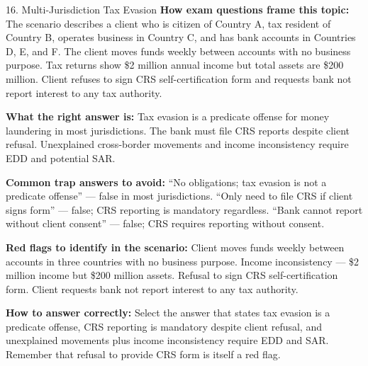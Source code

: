 \documentclass[11pt,a4paper]{beamer}
\begin{document}
	\begin{frame}{16. Multi-Jurisdiction Tax Evasion}
		\tiny
		\noindent\textbf{How exam questions frame this topic:} The scenario describes a client who is citizen of Country A, tax resident of Country B, operates business in Country C, and has bank accounts in Countries D, E, and F. The client moves funds weekly between accounts with no business purpose. Tax returns show \$2 million annual income but total assets are \$200 million. Client refuses to sign CRS self-certification form and requests bank not report interest to any tax authority.
		
		\vspace{0.1cm}
		\noindent\textbf{What the right answer is:} Tax evasion is a predicate offense for money laundering in most jurisdictions. The bank must file CRS reports despite client refusal. Unexplained cross-border movements and income inconsistency require EDD and potential SAR.
		
		\vspace{0.1cm}
		\noindent\textbf{Common trap answers to avoid:} “No obligations; tax evasion is not a predicate offense” — false in most jurisdictions. “Only need to file CRS if client signs form” — false; CRS reporting is mandatory regardless. “Bank cannot report without client consent” — false; CRS requires reporting without consent.
		
		\vspace{0.1cm}
		\noindent\textbf{Red flags to identify in the scenario:} Client moves funds weekly between accounts in three countries with no business purpose. Income inconsistency — \$2 million income but \$200 million assets. Refusal to sign CRS self-certification form. Client requests bank not report interest to any tax authority.
		
		\vspace{0.1cm}
		\noindent\textbf{How to answer correctly:} Select the answer that states tax evasion is a predicate offense, CRS reporting is mandatory despite client refusal, and unexplained movements plus income inconsistency require EDD and SAR. Remember that refusal to provide CRS form is itself a red flag.
	\end{frame}
	
\end{document}
